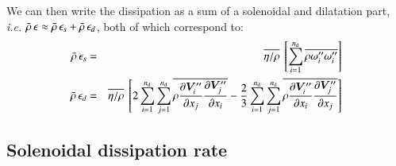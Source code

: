 \documentclass{warpdoc}
\newcommand{\alb}{\vspace{0.2cm}\\} %
\newcommand{\nd}{{{n}_{\rm d}}}
\begin{document}
%
We can then write the dissipation as a sum of a solenoidal
and dilatation part, \emph{i.e.}
$\bar{\rho}\,\epsilon\approx\bar{\rho}\,\epsilon_s+
\bar{\rho}\,\epsilon_d$, both of which correspond to:
%
\begin{eqnarray}
 \label{eqn:BDR:solenoidal}
 \wbar{\rho}\, \epsilon_s&=&
    \overline{\eta/\rho}~ 
    \left[
        \sum_{i=1}^\nd \overline{\rho \omega_i^{\prime\prime} \omega_i^{\prime\prime}}
    \right] \alb
 \label{eqn:BDR:dilatation}
 \wbar{\rho}\, \epsilon_d&=&
    \overline{\eta/\rho}~ 
    \left[
      2 \sum_{i=1}^\nd \sum_{j=1}^\nd \overline{\rho \frac{\partial \bm{V}_i^{\prime\prime}}{\partial x_j}  \frac{\partial \bm{V}_j^{\prime\prime}}{\partial x_i}}
     -  \frac{2}{3}  \sum_{i=1}^{\nd} \sum_{j=1}^{\nd}
           \overline{ \rho  \frac{\partial \bm{V}_i^{\prime\prime}}{\partial x_i}  \frac{\partial \bm{V}_j^{\prime\prime}}{\partial x_j}}
    \right]
\end{eqnarray}
%







\subsection{Solenoidal dissipation rate}
\end{document}
